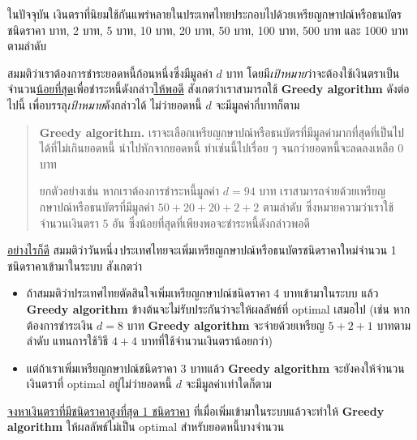 \question{}

ในปัจจุบัน เงินตราที่นิยมใช้กันแพร่หลายในประเทศไทยประกอบไปด้วยเหรียญกษาปณ์หรือธนบัตรชนิดราคา บาท, 2 บาท, 5 บาท, 10 บาท, 20 บาท, 50 บาท, 100 บาท, 500 บาท และ 1000 บาท ตามลำดับ

สมมติว่าเราต้องการชำระยอดหนี้ก้อนหนึ่งซึ่งมีมูลค่า $d$ บาท
โดยมี\emph{{\hrsp}เป้าหมาย{\hrsp}}ว่าจะต้องใช้เงินตราเป็นจำนวน\uline{น้อยที่สุด}เพื่อชำระหนี้ดังกล่าว\uline{ให้พอดี}\;
สังเกตว่าเราสามารถใช้ \textbf{Greedy algorithm} ดังต่อไปนี้ เพื่อบรรลุ{\hrsp}\emph{เป้าหมาย}{\hrsp}ดังกล่าวได้\hrsp%
ไม่ว่ายอดหนี้ $d$ จะมีมูลค่ากี่บาทก็ตาม

\begin{quote}
    \textbf{Greedy algorithm.} เราจะเลือกเหรียญกษาปณ์หรือธนบัตรที่มีมูลค่ามากที่สุดที่เป็นไปได้ที่ไม่เกินยอดหนี้ นำไปหักจากยอดหนี้ 
    ทำเช่นนี้ไปเรื่อย ๆ จนกว่ายอดหนี้จะลดลงเหลือ 0 บาท

    ยกตัวอย่างเช่น หากเราต้องการชำระหนี้มูลค่า $d = \mathrm{94}$ บาท เราสามารถจ่ายด้วยเหรียญกษาปณ์หรือธนบัตรที่มีมูลค่า 
    $\mathrm{50+20+20+2+2}$ ตามลำดับ ซึ่งหมายความว่าเราใช้จำนวนเงินตรา 5 อัน ซึ่งน้อยที่สุดที่เพียงพอจะชำระหนี้ดังกล่าวพอดี
\end{quote}

\uline{อย่างไรก็ดี} สมมติว่าวันหนึ่ง\,ประเทศไทยจะเพิ่มเหรียญกษาปณ์หรือธนบัตรชนิดราคาใหม่จำนวน
1 ชนิดราคาเข้ามาในระบบ สังเกตว่า

\begin{itemize}[before*=\small]

\item ถ้าสมมติว่าประเทศไทยตัดสินใจเพิ่มเหรียญกษาปณ์ชนิดราคา 4 บาทเข้ามาในระบบ แล้ว \textbf{Greedy algorithm} 
ข้างต้นจะไม่รับประกันว่าจะให้ผลลัพธ์ที่ optimal เสมอไป\; 
(เช่น หากต้องการชำระเงิน $d = \mathrm{8}$ บาท \textbf{Greedy algorithm} จะจ่ายด้วยเหรียญ $\mathrm{5+2+1}$ บาทตามลำดับ 
แทนการใช้วิธี $\mathrm{4+4}$ บาทที่ใช้จำนวนเงินตราน้อยกว่า)

\item แต่ถ้าเราเพิ่มเหรียญกษาปณ์ชนิดราคา 3 บาทแล้ว \textbf{Greedy algorithm} จะยังคงให้จำนวนเงินตราที่ optimal 
อยู่ไม่ว่ายอดหนี้ $d$ จะมีมูลค่าเท่าใดก็ตาม

\end{itemize}

\uline{จงหาเงินตราที่มีชนิดราคาสูงที่สุด 1 ชนิดราคา} ที่เมื่อเพิ่มเข้ามาในระบบแล้วจะทำให้ 
\textbf{Greedy algorithm} ให้ผลลัพธ์ไม่เป็น optimal สำหรับยอดหนี้บางจำนวน
